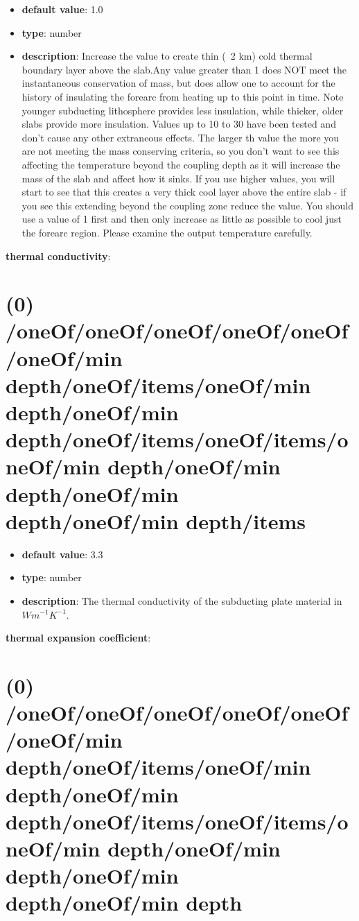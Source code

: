 \begin{itemize}[leftmargin=0em]\item {\bf default value}: 1.0
\item {\bf type}: number
\item {\bf description}: Increase the value to create thin (~2 km) cold thermal boundary layer above the slab.Any value greater than 1 does NOT meet the instantaneous conservation of mass, but does allow one to account for the history of insulating the forearc from heating up to this point in time. Note younger subducting lithosphere provides less insulation, while thicker, older slabs provide more insulation. Values up to 10 to 30 have been tested and don't cause any other extraneous effects. The larger th value the more you are not meeting the mass conserving criteria, so you don't want to see this affecting the temperature beyond the coupling depth as it will increase the mass of the slab and affect how it sinks.  If you use higher values, you will start to see that this creates a very thick cool layer above the entire slab - if you see this extending beyond the coupling zone reduce the value. You should use a value of 1 first and then only increase as little as possible to cool just the forearc region. Please examine the output temperature carefully. 
\end{itemize}\item {\bf thermal conductivity}: \section{(0) /oneOf/oneOf/oneOf/oneOf/oneOf/oneOf/min depth/oneOf/items/oneOf/min depth/oneOf/min depth/oneOf/items/oneOf/items/oneOf/min depth/oneOf/min depth/oneOf/min depth/oneOf/min depth/items}
\begin{itemize}[leftmargin=0em]\item {\bf default value}: 3.3
\item {\bf type}: number
\item {\bf description}: The thermal conductivity of the subducting plate material in $W m^{-1} K^{-1}$.
\end{itemize}\item {\bf thermal expansion coefficient}: \section{(0) /oneOf/oneOf/oneOf/oneOf/oneOf/oneOf/min depth/oneOf/items/oneOf/min depth/oneOf/min depth/oneOf/items/oneOf/items/oneOf/min depth/oneOf/min depth/oneOf/min depth/oneOf/min depth}
